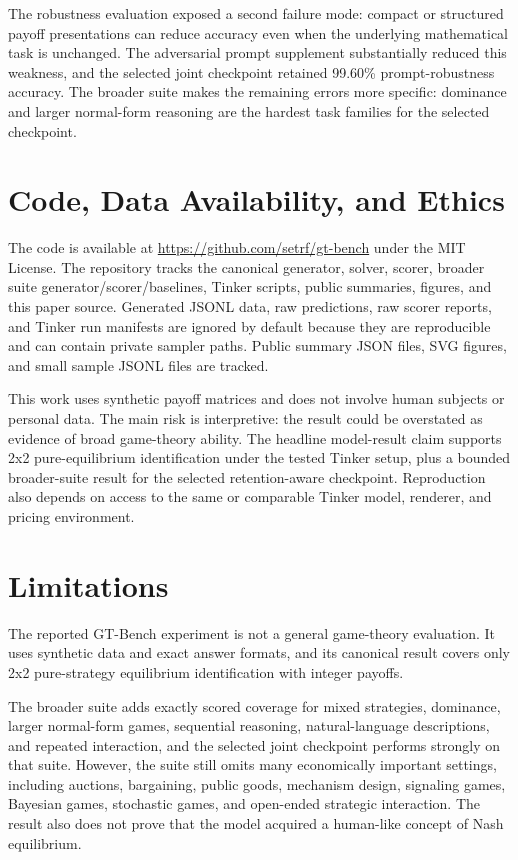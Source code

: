 \documentclass[11pt]{article}
\newcommand{\repo}{\url{https://github.com/setrf/gt-bench}}
\begin{document}
The robustness evaluation exposed a second failure mode: compact or structured payoff presentations can reduce accuracy even when the underlying mathematical task is unchanged. The adversarial prompt supplement substantially reduced this weakness, and the selected joint checkpoint retained 99.60\% prompt-robustness accuracy. The broader suite makes the remaining errors more specific: dominance and larger normal-form reasoning are the hardest task families for the selected checkpoint.

\section{Code, Data Availability, and Ethics}

The code is available at \repo{} under the MIT License. The repository tracks the canonical generator, solver, scorer, broader suite generator/scorer/baselines, Tinker scripts, public summaries, figures, and this paper source. Generated JSONL data, raw predictions, raw scorer reports, and Tinker run manifests are ignored by default because they are reproducible and can contain private sampler paths. Public summary JSON files, SVG figures, and small sample JSONL files are tracked.

This work uses synthetic payoff matrices and does not involve human subjects or personal data. The main risk is interpretive: the result could be overstated as evidence of broad game-theory ability. The headline model-result claim supports 2x2 pure-equilibrium identification under the tested Tinker setup, plus a bounded broader-suite result for the selected retention-aware checkpoint. Reproduction also depends on access to the same or comparable Tinker model, renderer, and pricing environment.

\section{Limitations}

The reported GT-Bench experiment is not a general game-theory evaluation. It uses synthetic data and exact answer formats, and its canonical result covers only 2x2 pure-strategy equilibrium identification with integer payoffs.

The broader suite adds exactly scored coverage for mixed strategies, dominance, larger normal-form games, sequential reasoning, natural-language descriptions, and repeated interaction, and the selected joint checkpoint performs strongly on that suite. However, the suite still omits many economically important settings, including auctions, bargaining, public goods, mechanism design, signaling games, Bayesian games, stochastic games, and open-ended strategic interaction. The result also does not prove that the model acquired a human-like concept of Nash equilibrium.
\end{document}
